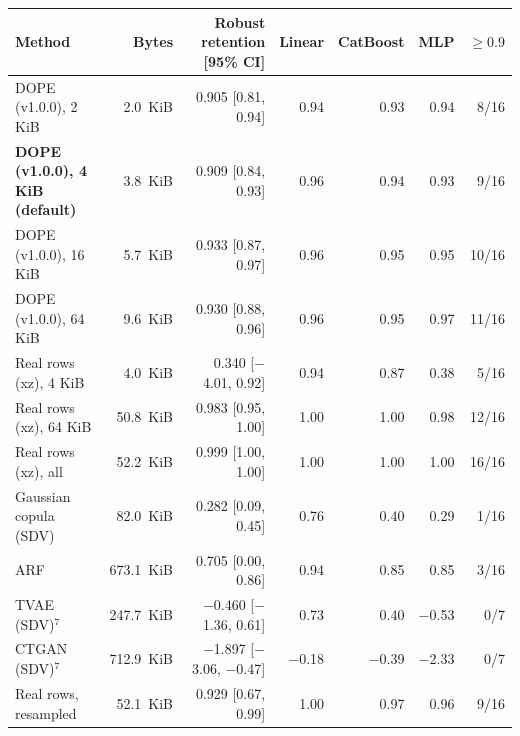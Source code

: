 \begin{tabular}{lrrrrrr}
\toprule
Method & Bytes & Robust retention [95\% CI] & Linear & CatBoost & MLP & $\geq 0.9$ \\
\midrule
DOPE (v1.0.0), 2 KiB & 2.0~KiB & 0.905 [0.81, 0.94] & 0.94 & 0.93 & 0.94 & 8/16 \\
\textbf{DOPE (v1.0.0), 4 KiB (default)} & 3.8~KiB & 0.909 [0.84, 0.93] & 0.96 & 0.94 & 0.93 & 9/16 \\
DOPE (v1.0.0), 16 KiB & 5.7~KiB & 0.933 [0.87, 0.97] & 0.96 & 0.95 & 0.95 & 10/16 \\
DOPE (v1.0.0), 64 KiB & 9.6~KiB & 0.930 [0.88, 0.96] & 0.96 & 0.95 & 0.97 & 11/16 \\
\midrule
Real rows (xz), 4 KiB & 4.0~KiB & 0.340 [\ensuremath{-}4.01, 0.92] & 0.94 & 0.87 & 0.38 & 5/16 \\
Real rows (xz), 64 KiB & 50.8~KiB & 0.983 [0.95, 1.00] & 1.00 & 1.00 & 0.98 & 12/16 \\
Real rows (xz), all & 52.2~KiB & 0.999 [1.00, 1.00] & 1.00 & 1.00 & 1.00 & 16/16 \\
\midrule
Gaussian copula (SDV) & 82.0~KiB & 0.282 [0.09, 0.45] & 0.76 & 0.40 & 0.29 & 1/16 \\
ARF & 673.1~KiB & 0.705 [0.00, 0.86] & 0.94 & 0.85 & 0.85 & 3/16 \\
TVAE (SDV)$^{7}$ & 247.7~KiB & \ensuremath{-}0.460 [\ensuremath{-}1.36, 0.61] & 0.73 & 0.40 & \ensuremath{-}0.53 & 0/7 \\
CTGAN (SDV)$^{7}$ & 712.9~KiB & \ensuremath{-}1.897 [\ensuremath{-}3.06, \ensuremath{-}0.47] & \ensuremath{-}0.18 & \ensuremath{-}0.39 & \ensuremath{-}2.33 & 0/7 \\
Real rows, resampled & 52.1~KiB & 0.929 [0.67, 0.99] & 1.00 & 0.97 & 0.96 & 9/16 \\
\bottomrule
\end{tabular}
